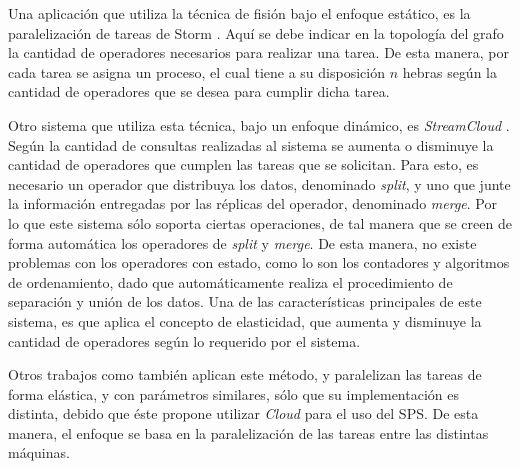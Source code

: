 

Una aplicación que utiliza la técnica de fisión bajo el enfoque estático, es la paralelización de tareas de Storm \citep{bookstorm}. Aquí se debe indicar en la topología del grafo la cantidad de operadores necesarios para realizar una tarea. De esta manera, por cada tarea se asigna un proceso, el cual tiene a su disposición $n$ hebras según la cantidad de operadores que se desea para cumplir dicha tarea.

Otro sistema que utiliza esta técnica, bajo un enfoque dinámico, es \textit{StreamCloud} \citep{GulisanoJPSV12}. Según la cantidad de consultas realizadas al sistema se aumenta o disminuye la cantidad de operadores que cumplen las tareas que se solicitan. Para esto, es necesario un operador que distribuya los datos, denominado \textit{split}, y uno que junte la información entregadas por las réplicas del operador, denominado \textit{merge}. \normalsize{Por lo que} este sistema sólo soporta ciertas operaciones, de tal manera que se creen de forma automática los operadores de \textit{split} y \textit{merge}. De esta manera, no existe problemas con los operadores con estado, como lo son los contadores y algoritmos de ordenamiento, dado que automáticamente realiza el procedimiento de separación y unión de los datos. Una de las características principales de este sistema, es que aplica el concepto de elasticidad, que aumenta y disminuye la cantidad de operadores según lo requerido por el sistema.

Otros trabajos como \citep{GedikSHW14, SchneiderAGBW09} también aplican este método, y paralelizan las tareas de forma elástica, y con parámetros similares, sólo que su implementación es distinta, debido que éste propone utilizar \textit{Cloud} para el uso del SPS. De esta manera, el enfoque se basa en la paralelización de las tareas entre las distintas máquinas.

